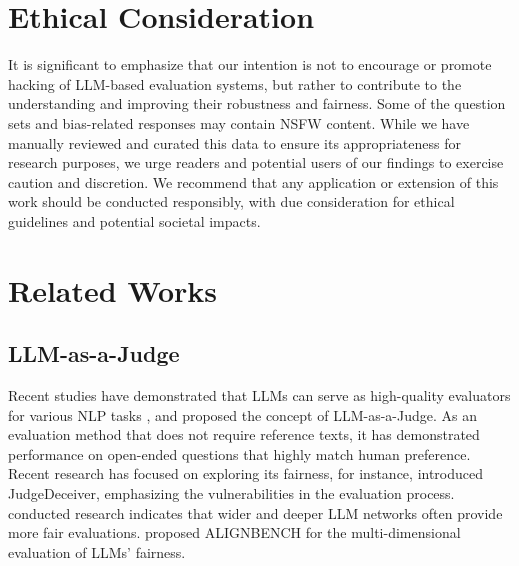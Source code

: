 \documentclass{article} %
\begin{document}
\newpage

\section*{Ethical Consideration}
It is significant to emphasize that our intention is not to encourage or promote hacking of LLM-based evaluation systems, but rather to contribute to the understanding and improving their robustness and fairness. Some of the question sets and bias-related responses may contain NSFW content. While we have manually reviewed and curated this data to ensure its appropriateness for research purposes, we urge readers and potential users of our findings to exercise caution and discretion. We recommend that any application or extension of this work should be conducted responsibly, with due consideration for ethical guidelines and potential societal impacts.




\appendix
\section{Related Works}
\subsection{LLM-as-a-Judge}
 Recent studies have demonstrated that LLMs can serve as high-quality evaluators for various NLP tasks \citep{ li2023prd, kasner2024traditionalbenchmarksanalyzingbehaviors, huang2024limitationsfinetunedjudgemodels, wang2023chatgptgoodnlgevaluator}, and \citet{zheng2024judging} proposed the concept of LLM-as-a-Judge. As an evaluation method that does not require reference texts, it has demonstrated performance on open-ended questions that highly match human preference. Recent research has focused on exploring its fairness, for instance, \citet{shi2024optimizationbasedpromptinjectionattack} introduced JudgeDeceiver, emphasizing the vulnerabilities in the evaluation process. \citet{zhang2023widerdeeperllmnetworks} conducted research indicates that wider and deeper LLM networks often provide more fair evaluations. \citet{liu2023alignbenchbenchmarkingchinesealignment} proposed ALIGNBENCH for the multi-dimensional evaluation of LLMs' fairness.
\end{document}
